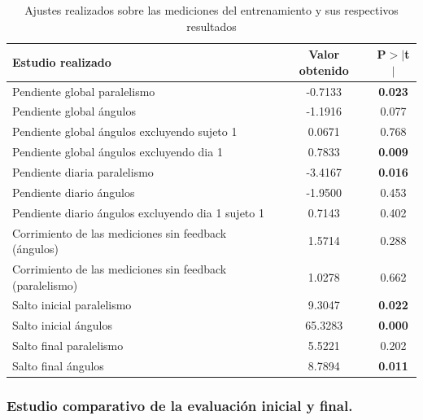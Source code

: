 \documentclass{article}
\begin{document}
    \begin{table}

    \begin{center}
    
    \caption{Ajustes realizados sobre las mediciones del entrenamiento y sus respectivos resultados}
    \label{tabla:betas}
    \vspace{0.3in}
    
    \begin{tabular}{lcc}
                Estudio realizado & Valor obtenido & P$>|$t$|$ \\
    \midrule
    \midrule
    
    Pendiente global paralelismo  &  -0.7133  &  \textbf{0.023} \\
    Pendiente global ángulos      &  -1.1916  &  0.077 \\
    Pendiente global ángulos excluyendo sujeto 1 &  0.0671  & 0.768 \\
    Pendiente global ángulos excluyendo dia 1    &  0.7833  & \textbf{0.009} \\
    Pendiente diaria paralelismo  &  -3.4167  &  \textbf{0.016} \\
    Pendiente diario ángulos      &  -1.9500  &  0.453 \\
    Pendiente diario ángulos excluyendo dia 1 sujeto 1 &  0.7143   &  0.402 \\
    Corrimiento de las mediciones sin feedback (ángulos)  &  1.5714  &  0.288 \\
    Corrimiento de las mediciones sin feedback (paralelismo)  &  1.0278  &  0.662 \\
    Salto inicial paralelismo     &  9.3047  &  \textbf{0.022} \\
    Salto inicial ángulos          &  65.3283  &  \textbf{0.000} \\
    Salto final paralelismo       &  5.5221  &  0.202 \\
    Salto final ángulos          &  8.7894  &  \textbf{0.011} \\
    
    \bottomrule
    \end{tabular}
    
    \end{center}
    
    \end{table}


\subsubsection{Estudio comparativo de la evaluación inicial y final.}
\end{document}
